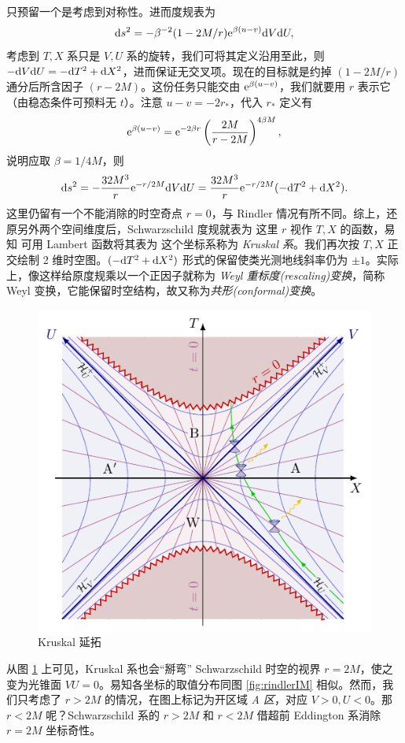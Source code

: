 只预留一个是考虑到对称性。进而度规表为
\[
\dd s^2=-\beta^{-2} (1-2M/r) \mathrm{e}^{\beta(u-v)} \dd V\dd U,
\]
考虑到 $T,X$ 系只是 $V,U$ 系的旋转，我们可将其定义沿用至此，则 $-\dd V\dd U=-\dd T^2+\dd X^2$，进而保证无交叉项。现在的目标就是约掉 $(1-2M/r)$ 通分后所含因子 $(r-2M)$。这份任务只能交由 $\mathrm{e}^{\beta(u-v)}$，我们就要用 $r$ 表示它（由稳态条件可预料无 $t$）。注意 $u-v=-2r_*$，代入 $r_*$ 定义有
\[
\mathrm{e}^{\beta(u-v)}=\mathrm{e}^{-2\beta r}\left(\frac{2M}{r-2M}\right)^{4\beta M},
\]
说明应取 $\beta=1/4M$，则
\[
\dd s^2=-\frac{32M^3}{r}\mathrm{e}^{-r/2M}\dd V\dd U=\frac{32M^3}{r}\mathrm{e}^{-r/2M}(-\dd T^2+\dd X^2).
\]
这里仍留有一个不能消除的时空奇点 $r=0$，与 Rindler 情况有所不同。综上，还原另外两个空间维度后，Schwarzschild 度规就表为
这里 $r$ 视作 $T,X$ 的函数，易知
可用 Lambert 函数将其表为
这个坐标系称为 \textit{Kruskal 系}。我们再次按 $T,X$ 正交绘制 2 维时空图。$(-\dd T^2+\dd X^2)$ 形式的保留使类光测地线斜率仍为 $\pm 1$。实际上，像这样给原度规乘以一个正因子就称为 \textit{Weyl 重标度(rescaling)变换}，简称 Weyl 变换，它能保留时空结构，故又称为\textit{共形(conformal)变换}。
\begin{figure}[h!]
    \centering
    \includegraphics[width=.6\textwidth]{fig/chpt02/kruskal.pdf}
    \caption{Kruskal 延拓}
    \label{fig:kruskal}
\end{figure}
从图 \ref{fig:kruskal} 上可见，Kruskal 系也会“掰弯” Schwarzschild 时空的视界 $r=2M$，使之变为光锥面 $VU=0$。易知各坐标的取值分布同图 \ref{fig:rindlerIM} 相似。然而，我们只考虑了 $r>2M$ 的情况，在图上标记为开区域 \textit{A 区}，对应 $V>0,U<0$。那 $r<2M$ 呢？Schwarzschild 系的 $r>2M$ 和 $r<2M$ 借超前 Eddington 系消除 $r=2M$ 坐标奇性。
